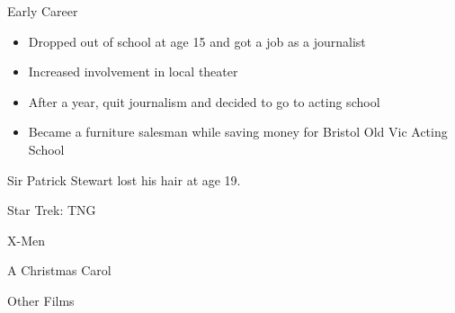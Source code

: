 \documentclass[xcolor=dvipsnames]{beamer}
\begin{document}
\begin{frame}{Early Career}
  \begin{itemize}
    \item Dropped out of school at age 15 and got a job as a journalist
    \item Increased involvement in local theater
    \item After a year, quit journalism and decided to go to acting school
    \item Became a furniture salesman while saving money for Bristol Old Vic
    Acting School
  \end{itemize}
  \begin{fct}
    Sir Patrick Stewart lost his hair at age 19.
  \end{fct}
\end{frame}



\begin{frame}{Star Trek: TNG}

\end{frame}

\begin{frame}{X-Men}

\end{frame}

\begin{frame}{A Christmas Carol}

\end{frame}

\begin{frame}{Other Films}

\end{frame}
\end{document}
